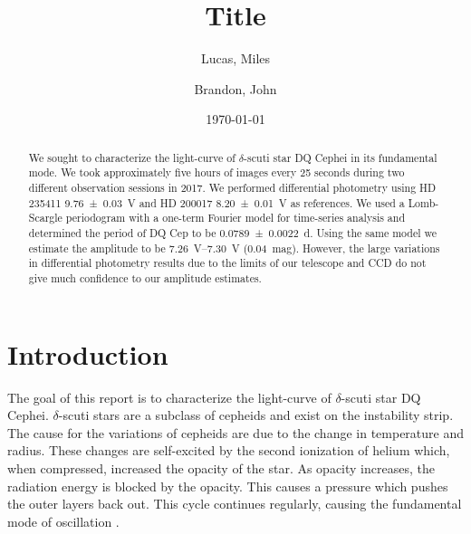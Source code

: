 \documentclass[%
aip,
jmp,
reprint,
floatfix,
nofootinbib
]{revtex4-1}
\begin{document}
	
	\title[Short title]{Title}
	
	\author{Lucas, Miles}
	\author{Brandon, John}
	
	\date{\today}
	
	

	\begin{abstract}
	We sought to characterize the light-curve of $\delta$-scuti star DQ Cephei in its fundamental mode. We took approximately five hours of images every 25 seconds during two different observation sessions in 2017. We performed differential photometry using HD 235411 \SI{9.76\pm.03}{V} and HD 200017 \SI{8.20\pm.01}{V} as references. We used a Lomb-Scargle periodogram with a one-term Fourier model for time-series analysis and determined the period of DQ Cep to be \SI{0.0789\pm.0022}{\day}. Using the same model we estimate the amplitude to be \SIrange{7.26}{7.30}{V} (\SI{.04}{mag}). However, the large variations in differential photometry results due to the limits of our telescope and CCD do not give much confidence to our amplitude estimates. 
		
	\end{abstract}
	
	\maketitle
	

	\section{Introduction}
	
	The goal of this report is to characterize the light-curve of $\delta$-scuti star DQ Cephei. $\delta$-scuti stars are a subclass of cepheids and exist on the instability strip. The cause for the variations of cepheids are due to the change in temperature and radius. These changes are self-excited by the second ionization of helium \citep{1963ApJ...138..487C} which, when compressed, increased the opacity of the star. As opacity increases, the radiation energy is blocked by the opacity. This causes a pressure which pushes the outer layers back out. This cycle continues regularly, causing the fundamental mode of oscillation \citep{1935PASP...47..232F}. 
	
\end{document}
